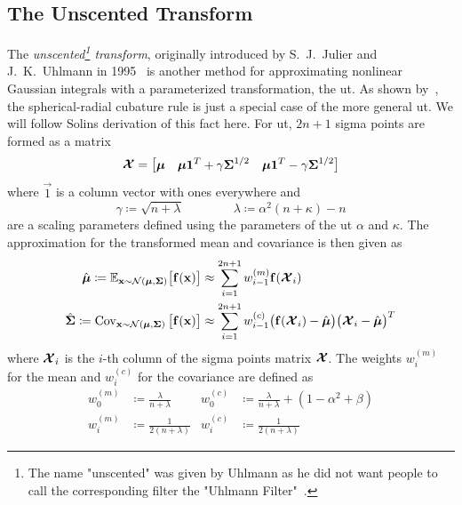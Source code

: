 	\subsection{The Unscented Transform}
		The \emph{unscented\footnote{The name "unscented" was given by Uhlmann as he did not want people to call the corresponding filter the "Uhlmann Filter"~\cite{FirstHandUnscentedTransform}.} transform}, originally introduced by S.~J.~Julier and J.~K.~Uhlmann in 1995~\cite{julierNewApproachFiltering1995} is another method for approximating nonlinear Gaussian integrals with a parameterized transformation, the \ac{ut}. As shown by~\cite{solinCubatureIntegrationMethods2010}, the spherical-radial cubature rule is just a special case of the more general \ac{ut}. We will follow Solins derivation of this fact here. For \ac{ut}, \( 2n + 1 \) sigma points are formed as a matrix
		\begin{equation}
			\boldsymbol{\mathrm{\mathcal{X}}} =
				\begin{bmatrix}
					\boldsymbol{\mathrm{\mu}} & \boldsymbol{\mathrm{\mu}} \boldsymbol{\mathrm{1}}^T + \gamma \boldsymbol{\mathrm{\Sigma}}^{1/2} & \boldsymbol{\mathrm{\mu}} \boldsymbol{\mathrm{1}}^T - \gamma \boldsymbol{\mathrm{\Sigma}}^{1/2}
				\end{bmatrix}  \label{eqn:utSigmaPoints}
		\end{equation}
		where \( \vec{1} \) is a column vector with ones everywhere and
		\begin{equation*}
			\gamma \coloneqq \sqrt{n + \lambda} \qquad\qquad \lambda \coloneqq \alpha^2 (n + \kappa) - n
		\end{equation*}
		are a scaling parameters defined using the parameters of the \ac{ut} \( \alpha \) and \( \kappa \). The approximation for the transformed mean and covariance is then given as
		\begin{align}
			\hat{\boldsymbol{\mathrm{\mu}}} \coloneqq \mathbb{E}_{\boldsymbol{\mathrm{x}} \sim \mathcal{N}(\boldsymbol{\mathrm{\mu}}, \boldsymbol{\mathrm{\Sigma}})}\big[ \boldsymbol{\mathrm{f}}(\boldsymbol{\mathrm{x}}) \big] &\approx \sum_{i = 1}^{2n + 1} w_{i - 1}^{(m)} \boldsymbol{\mathrm{f}}(\boldsymbol{\mathrm{\mathcal{X}}}_i)  \label{eqn:utMean} \\
			\hat{\boldsymbol{\mathrm{\Sigma}}} \coloneqq \operatorname{Cov}_{\boldsymbol{\mathrm{x}} \sim \mathcal{N}(\boldsymbol{\mathrm{\mu}}, \boldsymbol{\mathrm{\Sigma}})}\big[ \boldsymbol{\mathrm{f}}(\boldsymbol{\mathrm{x}}) \big] &\approx \sum_{i = 1}^{2n + 1} w_{i - 1}^{(c)} \big( \boldsymbol{\mathrm{f}}(\boldsymbol{\mathrm{\mathcal{X}}}_i) - \hat{\boldsymbol{\mathrm{\mu}}} \big) \big( \boldsymbol{\mathrm{\mathcal{X}}}_i - \hat{\boldsymbol{\mathrm{\mu}}} \big)^T  \label{eqn:utCov}
		\end{align}
		where \( \boldsymbol{\mathrm{\mathcal{X}}}_i \) is the \(i\)-th column of the sigma points matrix \( \boldsymbol{\mathrm{\mathcal{X}}} \). The weights \( w_i^{(m)} \) for the mean and \( w_i^{(c)} \) for the covariance are defined as
		\begin{align*}
			w_0^{(m)} &\coloneqq \frac{\lambda}{n + \lambda} & w_0^{(c)} &\coloneqq \frac{\lambda}{n + \lambda} + (1 - \alpha^2 + \beta) \\
			w_i^{(m)} &\coloneqq \frac{1}{2(n + \lambda)}    & w_i^{(c)} &\coloneqq \frac{1}{2(n + \lambda)}
		\end{align*}
